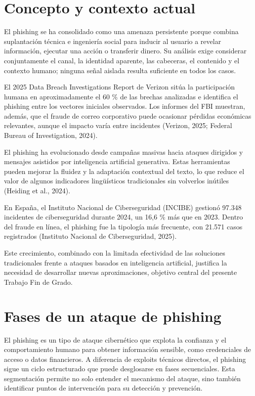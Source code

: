 \documentclass[11pt,a4paper,oneside]{report}
\begin{document}
\section{Concepto y contexto actual}

El phishing se ha consolidado como una amenaza persistente porque combina suplantación técnica e ingeniería social para inducir al usuario a revelar información, ejecutar una acción o transferir dinero. Su análisis exige considerar conjuntamente el canal, la identidad aparente, las cabeceras, el contenido y el contexto humano; ninguna señal aislada resulta suficiente en todos los casos.

El 2025 Data Breach Investigations Report de Verizon sitúa la participación humana en aproximadamente el 60 \% de las brechas analizadas e identifica el phishing entre los vectores iniciales observados. Los informes del FBI muestran, además, que el fraude de correo corporativo puede ocasionar pérdidas económicas relevantes, aunque el impacto varía entre incidentes (Verizon, 2025; Federal Bureau of Investigation, 2024).

El phishing ha evolucionado desde campañas masivas hacia ataques dirigidos y mensajes asistidos por inteligencia artificial generativa. Estas herramientas pueden mejorar la fluidez y la adaptación contextual del texto, lo que reduce el valor de algunos indicadores lingüísticos tradicionales sin volverlos inútiles (Heiding et al., 2024).

En España, el Instituto Nacional de Ciberseguridad (INCIBE) gestionó 97.348 incidentes de ciberseguridad durante 2024, un 16,6 \% más que en 2023. Dentro del fraude en línea, el phishing fue la tipología más frecuente, con 21.571 casos registrados (Instituto Nacional de Ciberseguridad, 2025).

Este crecimiento, combinado con la limitada efectividad de las soluciones tradicionales frente a ataques basados en inteligencia artificial, justifica la necesidad de desarrollar nuevas aproximaciones, objetivo central del presente Trabajo Fin de Grado.

\section{Fases de un ataque de phishing}

El phishing es un tipo de ataque cibernético que explota la confianza y el comportamiento humano para obtener información sensible, como credenciales de acceso o datos financieros. A diferencia de exploits técnicos directos, el phishing sigue un ciclo estructurado que puede desglosarse en fases secuenciales. Esta segmentación permite no solo entender el mecanismo del ataque, sino también identificar puntos de intervención para su detección y prevención.
\end{document}
